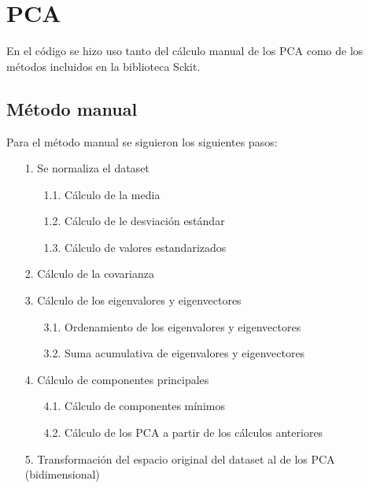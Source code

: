 \section[PCA]{PCA}
En el código se hizo uso tanto del cálculo manual de los PCA como de los métodos incluidos en la biblioteca Sckit.

\subsection[Manual]{Método manual}
Para el método manual se siguieron los siguientes pasos:
\begin{itemize}
    \item[1.] Se normaliza el dataset
    \begin{itemize}
        \item[1.1.] Cálculo de la media
        \item[1.2.] Cálculo de le desviación estándar
        \item[1.3.] Cálculo de valores estandarizados
    \end{itemize}
    \item[2.] Cálculo de la covarianza
    \item[3.] Cálculo de los eigenvalores y eigenvectores
    \begin{itemize}
        \item[3.1.] Ordenamiento de los eigenvalores y eigenvectores
        \item[3.2.] Suma acumulativa de eigenvalores y eigenvectores
    \end{itemize}
    \item[4.] Cálculo de componentes principales
    \begin{itemize}
        \item[4.1.] Cálculo de componentes mínimos
        \item[4.2.] Cálculo de los PCA a partir de los cálculos anteriores
    \end{itemize}
    \item[5.] Transformación del espacio original del dataset al de los PCA (bidimensional)
\end{itemize}

